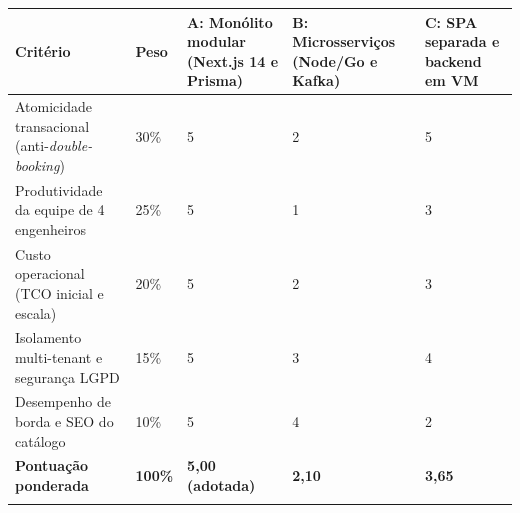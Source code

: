 {\footnotesize
\begin{tabularx}{\textwidth}{>{\hsize\sloppy\arraybackslash}X C{1.05cm} C{2.44cm} C{2.69cm} C{1.69cm}}
\toprule
{}
\textbf{Critério} & \textbf{Peso} & \textbf{A: Monólito modular (Next.js 14 e Prisma)} & \textbf{B: Microsserviços (Node/Go e Kafka)} & \textbf{C: SPA separada e backend em VM} \\
\midrule
{}
Atomicidade transacional (anti-\emph{double-booking}) & 30\% & 5 & 2 & 5 \\
\midrule
Produtividade da equipe de 4 engenheiros & 25\% & 5 & 1 & 3 \\
\midrule
Custo operacional (TCO inicial e escala) & 20\% & 5 & 2 & 3 \\
\midrule
Isolamento multi-tenant e segurança LGPD & 15\% & 5 & 3 & 4 \\
\midrule
Desempenho de borda e SEO do catálogo & 10\% & 5 & 4 & 2 \\
\midrule
\textbf{Pontuação ponderada} & \textbf{100\%} & \textbf{5,00 (adotada)} & \textbf{2,10} & \textbf{3,65} \\
\bottomrule
\end{tabularx}%
}
